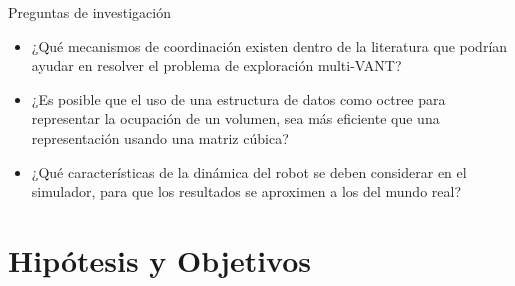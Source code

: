 \documentclass[
  24pt, %
  aspectratio=169, %
]{beamer}
\begin{document}
\begin{frame}
  
  
\end{frame}

\begin{frame}{Preguntas de investigación}
  
  \begin{itemize}

  \item ¿Qué mecanismos de coordinación existen dentro de la literatura que podrían ayudar en resolver el problema de exploración multi-VANT?
  \item ¿Es posible que el uso de una estructura de datos como octree para representar la ocupación de un volumen, sea más eficiente que una representación usando una matriz cúbica?
  \item ¿Qué características de la dinámica del robot se deben considerar en el simulador, para que los resultados se aproximen a los del mundo real?
    
  \end{itemize}
\end{frame}

\section{Hipótesis y Objetivos}
\end{document}
